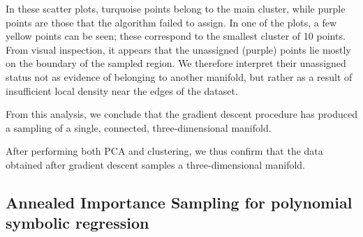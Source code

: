 \documentclass[11pt]{article}
\begin{document}
		In these scatter plots, turquoise points belong to the main cluster, while purple points are those that the algorithm failed to assign. In one of the plots, a few yellow points can be seen; these correspond to the smallest cluster of 10 points. From visual inspection, it appears that the unassigned (purple) points lie mostly on the boundary of the sampled region. We therefore interpret their unassigned status not as evidence of belonging to another manifold, but rather as a result of insufficient local density near the edges of the dataset.
		
		From this analysis, we conclude that the gradient descent procedure has produced a sampling of a single, connected, three-dimensional manifold.
		
		\vspace{0.5em}
		
		After performing both PCA and clustering, we thus confirm that the data obtained after gradient descent samples a three-dimensional manifold.

	\subsection{Annealed Importance Sampling for polynomial symbolic regression}
		
\end{document}
